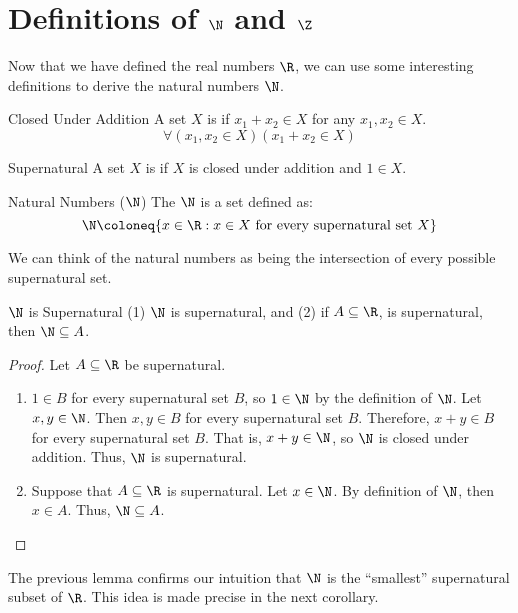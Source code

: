 \documentclass[letterpaper,12pt]{report}
\begin{document}
\section{Definitions of $\N$ and $\Z$}
Now that we have defined the real numbers $\R$, we can use some interesting definitions to derive the natural numbers $\N$.

\begin{dfnbox}{Closed Under Addition}{}
	A set $X$ is  if $x_1+x_2 \in X$ for any $x_1, x_2 \in X$.
	\tcblower
	\[ \forall (x_1, x_2 \in X) (x_1 + x_2 \in X) \]
\end{dfnbox}

\begin{dfnbox}{Supernatural}{}
	A set $X$ is  if $X$ is closed under addition and $1 \in X$.
\end{dfnbox}

\begin{dfnbox}{Natural Numbers ($\N$)}{}
	The  $\N$ is a set defined as:
	\tcblower
	\[ \N \coloneq \{ x \in \R : x \in X\ \text{for every supernatural set}\ X\} \]
\end{dfnbox}

We can think of the natural numbers as being the intersection of every possible supernatural set.

\begin{exbox}{$\N$ is Supernatural}{}
	(1) $\N$ is supernatural, and (2) if $A \subseteq \R$, is supernatural, then $\N \subseteq A$.
	\tcblower
	\begin{proof} Let $A \subseteq \R$ be supernatural.

		\begin{enumerate}
			\item $1 \in B$ for every supernatural set $B$, so $1 \in \N$ by the definition of $\N$. Let $x,y \in \N$. Then $x,y \in B$ for every supernatural set $B$. Therefore, $x+y \in B$ for every supernatural set $B$. That is, $x+y \in \N$, so $\N$ is closed under addition. Thus, $\N$ is supernatural.
			\item Suppose that $A \subseteq \R$ is supernatural. Let $x \in \N$. By definition of $\N$, then $x \in A$. Thus, $\N \subseteq A$.
		\end{enumerate}
	\end{proof}
\end{exbox}

The previous lemma confirms our intuition that $\N$ is the ``smallest'' supernatural subset of $\R$. This idea is made precise in the next corollary.
\end{document}
